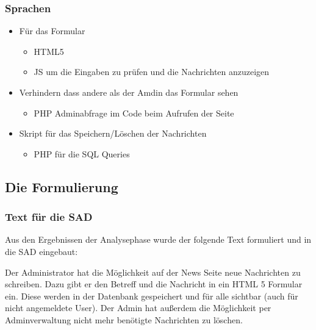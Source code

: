 \begin{frame} %
  \frametitle{Sprachen} %

   \begin{itemize}
    \item Für das Formular
    \begin{itemize}
     \item HTML5
     \item JS um die Eingaben zu prüfen und die Nachrichten anzuzeigen
    \end{itemize}

    \item Verhindern dass andere als der Amdin das Formular sehen
    \begin{itemize}
     \item PHP Adminabfrage im Code beim Aufrufen der Seite
    \end{itemize}

    \item Skript für das Speichern/Löschen der Nachrichten
    \begin{itemize}
     \item PHP für die SQL Queries 
    \end{itemize}
    

   \end{itemize}

\end{frame}

\subsection{Die Formulierung}
\begin{frame} %
  \frametitle{Text für die SAD} %

  Aus den Ergebnissen der Analysephase wurde der folgende Text formuliert und in die SAD eingebaut:

  \begin{block}{}
	Der Administrator hat die Möglichkeit auf der News Seite neue Nachrichten zu schreiben. Dazu gibt er den
	Betreff und die Nachricht in ein HTML 5 Formular ein. Diese werden in der Datenbank gespeichert und für alle
	sichtbar (auch für nicht angemeldete User). Der Admin hat außerdem die Möglichkeit per Adminverwaltung
	nicht mehr benötigte Nachrichten zu löschen.
  \end{block}

\end{frame}

